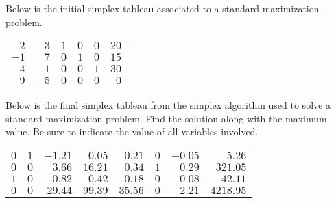 \documentclass[12pt,letterpaper]{exam}
\begin{document}
\begin{questions}
\newpage
\question Below is the initial simplex tableau associated to a standard maximization problem. 
	\begin{table}[!ht]
	\centering
	\begin{tabular}{rrrrr|r}
	$2$ & $3$ & $1$ & $0$ & $0$ & $20$ \\
	$-1$ & $7$ & $0$ & $1$ & $0$ & $15$ \\
	$4$ & $1$ & $0$ & $0$ & $1$ & $30$ \\ \hline
	$9$ & $-5$ & $0$ & $0$ & $0$ & $0$ 
	\end{tabular}
	\end{table}




\newpage
\question[10] Below is the final simplex tableau from the simplex algorithm used to solve a standard maximization problem. Find the solution along with the maximum value. Be sure to indicate the value of all variables involved. 
	\begin{table}[!ht]
	\centering
	\begin{tabular}{rrrrrrr|r}
	$0$ & $1$ & $-1.21$ & $0.05$ & $0.21$ & $0$ & $-0.05$ & $5.26$ \\
	$0$ & $0$ & $3.66$ & $16.21$ & $0.34$ & $1$ & $0.29$ & $321.05$ \\
	$1$ & $0$ & $0.82$ & $0.42$ & $0.18$ & $0$ & $0.08$ & $42.11$ \\ \hline
	$0$ & $0$ & $29.44$ & $99.39$ & $35.56$ & $0$ & $2.21$ & $4218.95$ \\
	\end{tabular}
	\end{table}




\end{questions}
\end{document}
